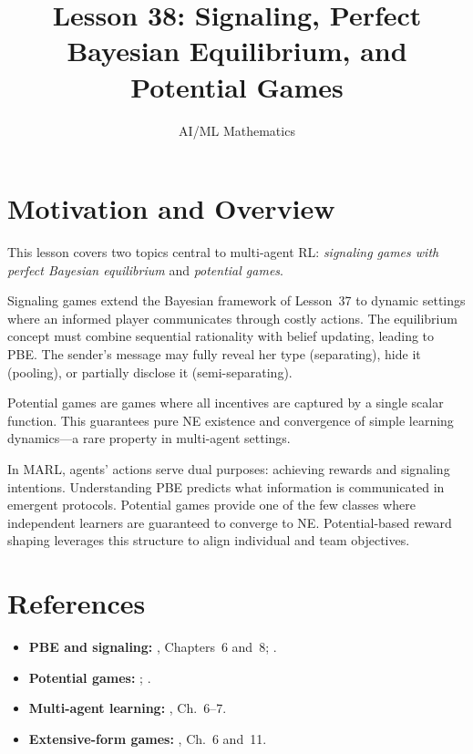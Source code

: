 \documentclass[11pt,a4paper]{article}
\title{Lesson 38: Signaling, Perfect Bayesian Equilibrium, and Potential Games}
\author{AI/ML Mathematics}
\date{}
\begin{document}
\maketitle
\tableofcontents
\newpage


\section{Motivation and Overview}
\label{sec:motivation}

This lesson covers two topics central to multi-agent RL: \emph{signaling
games with perfect Bayesian equilibrium} and \emph{potential games}.

Signaling games extend the Bayesian framework of Lesson~37 to dynamic
settings where an informed player communicates through costly actions.
The equilibrium concept must combine sequential rationality with belief
updating, leading to PBE. The sender's message may fully reveal her type
(separating), hide it (pooling), or partially disclose it
(semi-separating).

Potential games are games where all incentives are captured by a single
scalar function. This guarantees pure NE existence and convergence of
simple learning dynamics---a rare property in multi-agent settings.

\begin{rlconnection}[title={Signaling and Potential Structure in MARL}]
In MARL, agents' actions serve dual purposes: achieving rewards and
signaling intentions. Understanding PBE predicts what information is
communicated in emergent protocols. Potential games provide one of the
few classes where independent learners are guaranteed to converge to NE.
Potential-based reward shaping leverages this structure to align
individual and team objectives.
\end{rlconnection}


\section{References}
\label{sec:references}

\begin{itemize}
    \item \textbf{PBE and signaling:} \citet{fudenberg1991}, Chapters~6
    and~8; \citet{spence1973}.
    \item \textbf{Potential games:} \citet{monderer1996};
    \citet{rosenthal1973}.
    \item \textbf{Multi-agent learning:} \citet{shoham2008}, Ch.~6--7.
    \item \textbf{Extensive-form games:} \citet{osborne1994}, Ch.~6
    and~11.
\end{itemize}
\end{document}
